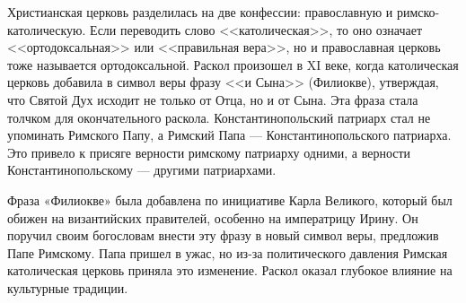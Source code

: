 
Христианская церковь разделилась на две конфессии: православную и римско-католическую. Если переводить слово <<католическая>>, то оно означает <<ортодоксальная>> или <<правильная вера>>, но и православная церковь тоже называется ортодоксальной. Раскол произошел в XI веке, когда католическая церковь добавила в символ веры фразу <<и Сына>> (Филиокве), утверждая, что Святой Дух исходит не только от Отца, но и от Сына. Эта фраза стала толчком для окончательного раскола. Константинопольский патриарх стал не упоминать Римского Папу, а Римский Папа --- Константинопольского патриарха. Это привело к присяге верности римскому патриарху одними, а верности Константинопольскому --- другими патриархами.

Фраза «Филиокве» была добавлена по инициативе Карла Великого, который был обижен на византийских правителей, особенно на императрицу Ирину. Он поручил своим богословам внести эту фразу в новый символ веры, предложив Папе Римскому. Папа пришел в ужас, но из-за политического давления Римская католическая церковь приняла это изменение. Раскол оказал глубокое влияние на культурные традиции.

